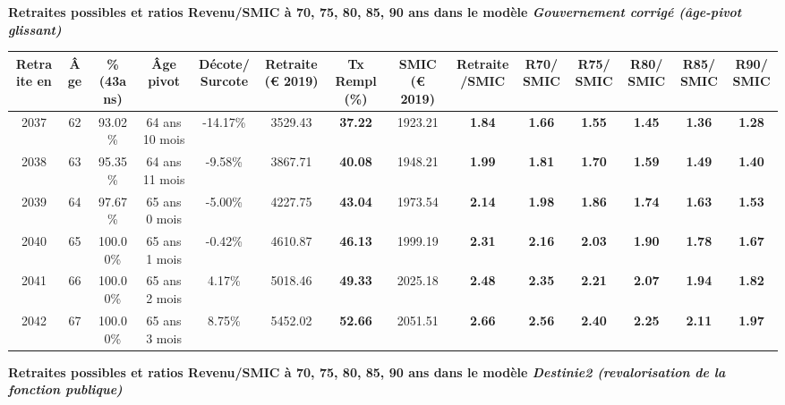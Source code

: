  \vspace{0.1cm} 
{\bf \noindent Retraites possibles et ratios Revenu/SMIC à 70, 75, 80, 85, 90 ans dans le modèle \emph{Gouvernement corrigé (âge-pivot glissant)}}  
 
\begin{adjustbox}{max width=\textwidth} 
\begin{tabular}[htb]{|c|c||c|c|c||c|c||c|c||c|c|c|c|c|} 
\hline 
 Retraite en &  Âge &  \%(43ans) &  Âge pivot &  Décote/Surcote &  Retraite (\euro{} 2019) &  Tx Rempl(\%) &  SMIC (\euro{} 2019) &  Retraite/SMIC &  R70/SMIC &  R75/SMIC &  R80/SMIC &  R85/SMIC &  R90/SMIC \\ 
\hline \hline 
 2037 &  62 &  93.02\% &  64 ans 10 mois &  -14.17\% &  3529.43 &  {\bf 37.22} &  1923.21 &  {\bf 1.84} &  {\bf 1.66} &  {\bf 1.55} &  {\bf 1.45} &  {\bf 1.36} &  {\bf 1.28} \\ 
\hline 
 2038 &  63 &  95.35\% &  64 ans 11 mois &  -9.58\% &  3867.71 &  {\bf 40.08} &  1948.21 &  {\bf 1.99} &  {\bf 1.81} &  {\bf 1.70} &  {\bf 1.59} &  {\bf 1.49} &  {\bf 1.40} \\ 
\hline 
 2039 &  64 &  97.67\% &  65 ans 0 mois &  -5.00\% &  4227.75 &  {\bf 43.04} &  1973.54 &  {\bf 2.14} &  {\bf 1.98} &  {\bf 1.86} &  {\bf 1.74} &  {\bf 1.63} &  {\bf 1.53} \\ 
\hline 
 2040 &  65 &  100.00\% &  65 ans 1 mois &  -0.42\% &  4610.87 &  {\bf 46.13} &  1999.19 &  {\bf 2.31} &  {\bf 2.16} &  {\bf 2.03} &  {\bf 1.90} &  {\bf 1.78} &  {\bf 1.67} \\ 
\hline 
 2041 &  66 &  100.00\% &  65 ans 2 mois &  4.17\% &  5018.46 &  {\bf 49.33} &  2025.18 &  {\bf 2.48} &  {\bf 2.35} &  {\bf 2.21} &  {\bf 2.07} &  {\bf 1.94} &  {\bf 1.82} \\ 
\hline 
 2042 &  67 &  100.00\% &  65 ans 3 mois &  8.75\% &  5452.02 &  {\bf 52.66} &  2051.51 &  {\bf 2.66} &  {\bf 2.56} &  {\bf 2.40} &  {\bf 2.25} &  {\bf 2.11} &  {\bf 1.97} \\ 
\hline 
\hline 
\end{tabular} 
\end{adjustbox} 
 
 \vspace{0.1cm} 
{\bf \noindent Retraites possibles et ratios Revenu/SMIC à 70, 75, 80, 85, 90 ans dans le modèle \emph{Destinie2 (revalorisation de la fonction publique)}}  
 
